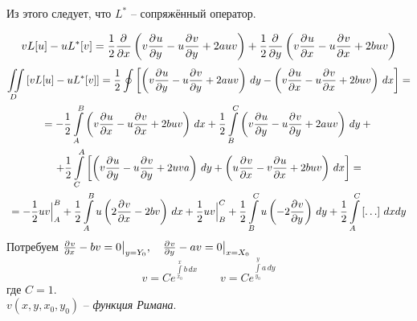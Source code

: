 Из этого следует, что $L^*$ -- сопряжённый оператор.

\[
	v L[u] - u L^*[v] = \frac{1}{2} \frac{\partial^{}}{\partial x^{}} \left( v \frac{\partial^{}u}{\partial y^{}} - u \frac{\partial^{}v}{\partial y^{}} + 2 auv \right) + \frac{1}{2} \frac{\partial^{}}{\partial y^{}}\left(v \frac{\partial^{}u}{\partial x^{}} - u \frac{\partial^{}v}{\partial x^{}} + 2 b u v\right)
\]
\begin{multline*}
	\iint\limits_D\left[v L[u] - u L^* [v] \right] = \frac{1}{2} \oint \left[ \left(v \frac{\partial^{}u}{\partial y^{}} - u \frac{\partial^{}v}{\partial y^{}}  + 2 au v\right)\, dy - \left(v \frac{\partial^{}u}{\partial x^{}} - u \frac{\partial^{}v}{\partial x^{}} + 2 b u v \right)\, dx \right] = \\
	= - \frac{1}{2} \int\limits_A^B \left(v \frac{\partial^{}u}{\partial x^{}} - u \frac{\partial^{}v}{\partial x^{}} + 2 buv\right)\, dx + \frac{1}{2} \int\limits_B^C \left(v \frac{\partial^{}u}{\partial y^{}} - u \frac{\partial^{}v}{\partial y^{}} + 2 auv\right)\, dy +{}\\+ \frac{1}{2} \int\limits_C^A \left[\left(v \frac{\partial^{}u}{\partial y^{}} - u \frac{\partial^{}v}{\partial y^{}} + 2 u v a\right)\, dy + \left(u \frac{\partial^{}v}{\partial x^{}} - v \frac{\partial^{}u}{\partial x^{}} + 2 b u v \right)\, dx\right] =\\
	= - \frac{1}{2} uv \Big|_A^B + \frac{1}{2} \int\limits_A^B u \left( 2 \frac{\partial^{}v}{\partial x^{}} - 2 bv \right)\, dx + \frac{1}{2} uv \Big|_B^C + \frac{1}{2} \int\limits_B^C u \left(-2 \frac{\partial^{}v}{\partial y^{}} \right)\, dy + \frac{1}{2} \int\limits_A^C \left[\ldots \right]\, dx dy
\end{multline*}
Потребуем $\frac{\partial^{}v}{\partial x^{}} - bv = 0 \big|_{y = Y_0}, \quad \frac{\partial^{}v}{\partial y^{}} - a v = 0 \big|_{x = X_0}$\\

\begin{equation}
	v = C e^{\int\limits_{x_0}^x b \,dx} \qquad v = C e^{\int\limits_{y_0}^y a \,dy}
	\label{equ:equRiman}
\end{equation}
где $C = 1$.\\
$v(x, y, x_0, y_0)$ -- \textit{функция Римана}.\\

